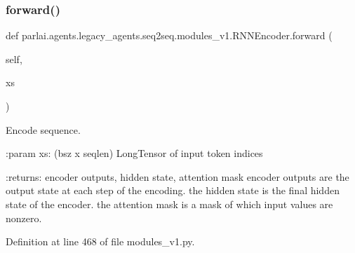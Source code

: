 \subsubsection{\texorpdfstring{forward()}{forward()}}
{\footnotesize\ttfamily def parlai.\+agents.\+legacy\+\_\+agents.\+seq2seq.\+modules\+\_\+v1.\+R\+N\+N\+Encoder.\+forward (\begin{DoxyParamCaption}\item[{}]{self,  }\item[{}]{xs }\end{DoxyParamCaption})}

\begin{DoxyVerb}Encode sequence.

:param xs: (bsz x seqlen) LongTensor of input token indices

:returns: encoder outputs, hidden state, attention mask
    encoder outputs are the output state at each step of the encoding.
    the hidden state is the final hidden state of the encoder.
    the attention mask is a mask of which input values are nonzero.
\end{DoxyVerb}
 

Definition at line 468 of file modules\+\_\+v1.\+py.


